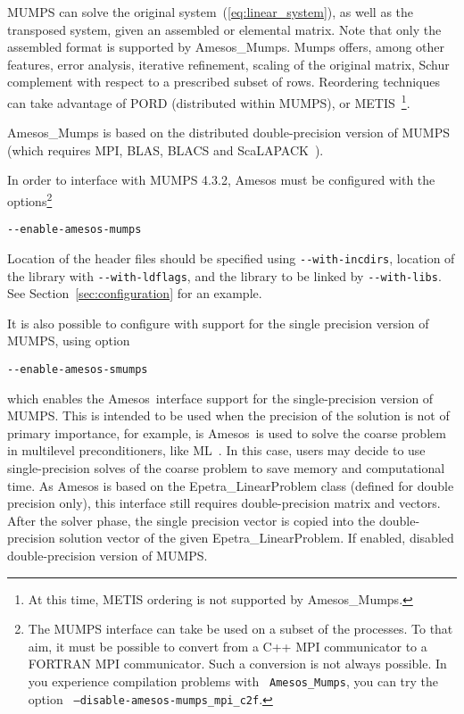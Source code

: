 \documentclass[11pt]{SANDreport}
\newcommand{\amesos}{{\sc Amesos}}
\newcommand{\ml}{{\sc ML}}
\begin{document}
MUMPS can solve the original system~(\ref{eq:linear_system}), as well as
the transposed system, given an assembled or elemental matrix. Note that
only the assembled format is supported by Amesos\_Mumps. Mumps offers,
among other features, error analysis, iterative refinement, scaling of
the original matrix, Schur complement with respect to a prescribed
subset of rows. Reordering techniques can take advantage of PORD
(distributed within MUMPS), or METIS~\cite{METIS}\footnote{At this time,
  METIS ordering is not supported by Amesos\_Mumps.}. 

Amesos\_Mumps is based on the distributed double-precision version of
MUMPS (which requires MPI, BLAS, BLACS
and ScaLAPACK~\cite{scalapack}).  

\medskip

In order to interface with MUMPS 4.3.2, Amesos must be configured with
the options\footnote{The MUMPS interface can take be used on a subset of
  the processes. To that aim, it must be possible to convert from a C++
  MPI communicator to a FORTRAN MPI communicator. Such a conversion is
  not always possible. In you experience compilation problems with {\tt
    Amesos\_Mumps}, you can try the option {\tt
    --disable-amesos-mumps\_mpi\_c2f}.}
\begin{verbatim}
--enable-amesos-mumps 
\end{verbatim}
Location of the header files should be specified using \verb!--with-incdirs!,
location of the library with \verb!--with-ldflags!, and the library
to be linked by \verb!--with-libs!. See Section~\ref{sec:configuration} for an
example.

It is also possible to configure with support for the single precision
version of MUMPS, using option
\begin{verbatim}
--enable-amesos-smumps 
\end{verbatim}
which enables the \amesos\ interface support for the
single-precision version of MUMPS. This is intended to be used when
the precision of the solution is not of primary importance, for example,
is \amesos\ is used to solve the coarse problem in multilevel
preconditioners, like \ml~\cite{ml-guide}. In this case, users may decide
to use single-precision solves of the coarse problem
to save memory and computational time. As
Amesos is based on the Epetra\_LinearProblem class
(defined for double precision only), this interface
still requires double-precision matrix and vectors.
After the solver phase, the single precision vector
is copied into the double-precision solution vector
of the given Epetra\_LinearProblem. If enabled,
disabled double-precision version of MUMPS.
\end{document}
